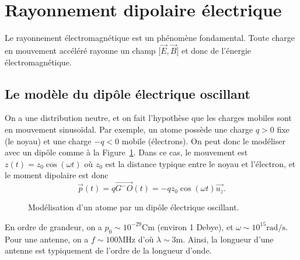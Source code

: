 \section{Rayonnement dipolaire électrique}

Le rayonnement électromagnétique est un phénomène fondamental. Toute charge en mouvement accéléré rayonne un champ [$\vec{E},\vec{B}$] et donc de l'énergie électromagnétique.

\subsection{Le modèle du dipôle électrique oscillant}

On a une distribution neutre, et on fait l'hypothèse que les charges mobiles sont en mouvement sinusoïdal. Par exemple, un atome possède une charge $q>0$ fixe (le noyau) et une charge $-q<0$ mobile (électrons). On peut donc le modéliser avec un dipôle comme à la Figure~\ref{fig:modelisation_atome_dipole_oscillant}. Dans ce cas, le mouvement est~$z(t)=z_{0}\cos(\omega t)$ où $z_{0}$ est la distance typique entre le noyau et l'électron, et le moment dipolaire est donc
\begin{equation*}
    \boxed{
        \vec{p}(t)=q\vec{G^{-}O}(t)=-qz_{0}\cos(\omega t)\vec{u_{z}}.
    }
\end{equation*}

\begin{figure}
    \centering
    \caption{Modélisation d'un atome par un dipôle électrique oscillant.}    
    \label{fig:modelisation_atome_dipole_oscillant}
\end{figure}

En ordre de grandeur, on a $p_{0}\sim 10^{-29}\si{\coulomb\metre}$ (environ 1 Debye), et $\omega\sim 10^{15}\si{\radian\per\second}$. Pour une antenne, on a $f\sim 100\si{\mega\hertz}$ d'où $\lambda\sim 3\si{\metre}$. Ainsi, la longueur d'une antenne est typiquement de l'ordre de la longueur d'onde.

